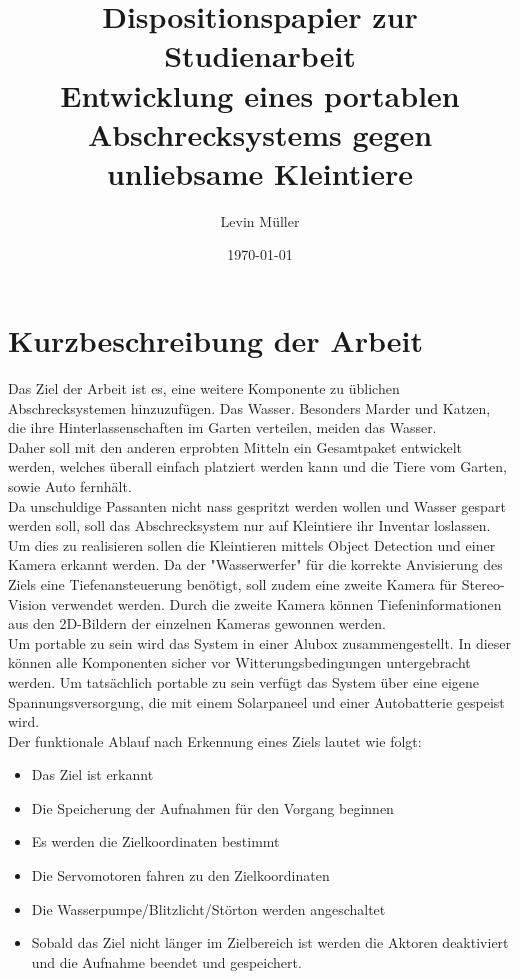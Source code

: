 \documentclass{scrartcl}
\title{Dispositionspapier zur Studienarbeit\\
Entwicklung eines portablen Abschrecksystems gegen unliebsame Kleintiere}
\author{ Levin Müller }
\date{\today}
\begin{document}
\maketitle

\section{Kurzbeschreibung der Arbeit}

Das Ziel der Arbeit ist es, eine weitere Komponente zu üblichen Abschrecksystemen hinzuzufügen. Das Wasser.
Besonders Marder und Katzen, die ihre Hinterlassenschaften im Garten verteilen,
meiden das Wasser.
\\
Daher soll mit den anderen erprobten Mitteln ein Gesamtpaket entwickelt werden,
welches überall einfach platziert werden kann und die Tiere vom Garten, sowie Auto fernhält. \\
Da unschuldige Passanten nicht nass gespritzt werden wollen und Wasser
gespart werden soll, soll das Abschrecksystem nur auf Kleintiere ihr Inventar loslassen. Um dies zu realisieren sollen die Kleintieren mittels Object Detection und einer Kamera erkannt werden. Da der "Wasserwerfer" für die korrekte Anvisierung des Ziels eine Tiefenansteuerung benötigt, soll zudem eine zweite Kamera für Stereo-Vision verwendet werden. Durch die zweite Kamera können Tiefeninformationen aus den 2D-Bildern der einzelnen Kameras gewonnen werden.
\\
Um portable zu sein wird das System in einer Alubox zusammengestellt. In dieser können alle Komponenten sicher vor Witterungsbedingungen untergebracht werden. Um tatsächlich portable zu sein verfügt das System über eine eigene Spannungsversorgung, die mit einem Solarpaneel und einer Autobatterie gespeist wird.
\\

Der funktionale Ablauf nach Erkennung eines Ziels lautet wie folgt:
\begin{itemize}
    \item Das Ziel ist erkannt
    \item Die Speicherung der Aufnahmen für den Vorgang beginnen
    \item Es werden die Zielkoordinaten bestimmt
    \item Die Servomotoren fahren zu den Zielkoordinaten
    \item Die Wasserpumpe/Blitzlicht/Störton werden angeschaltet
    \item Sobald das Ziel nicht länger im Zielbereich ist werden die Aktoren deaktiviert und die Aufnahme beendet und gespeichert.
\end{itemize}
\end{document}
